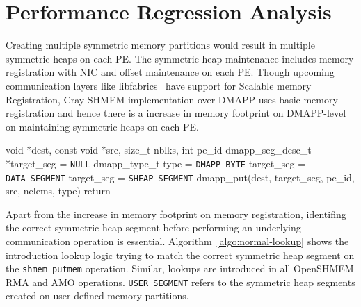 \section{Performance Regression Analysis}
\label{src:regression}
Creating multiple symmetric memory partitions would result in
multiple symmetric heaps on each PE. The symmetric heap maintenance
includes memory registration with NIC and offset maintenance on
each PE. Though upcoming communication layers like
libfabrics~\cite{libfabrics} have support for Scalable memory
Registration, Cray SHMEM implementation over DMAPP uses basic memory
registration and hence there is a increase in memory footprint on
DMAPP-level on maintaining symmetric heaps on each PE.

\vspace{-20pt}
\begin{algorithm}[!h]
\begin{algorithmic}
    {void *dest, const void *src, size\_t nblks, int pe\_id}\;
        dmapp\_seg\_desc\_t *target\_seg = \texttt{NULL}\;
        dmapp\_type\_t type = \texttt{DMAPP\_BYTE}\;
         {
            target\_seg = \texttt{DATA\_SEGMENT}\;
        }  {
            target\_seg = \texttt{SHEAP\_SEGMENT}\;
        } 
        dmapp\_put(dest, target\_seg, pe\_id, src, nelems, type)\;
        return\;
    \EndProcedure
    \caption{Lookup logic with N symmetric memory partitions per PE}
    \label{algo:normal-lookup}
\end{algorithmic}
\end{algorithm}
\vspace{-20pt}

Apart from the increase in memory footprint on memory registration,
identifing the correct symmetric heap segment before performing an
underlying communication operation is essential. %
Algorithm~\ref{algo:normal-lookup} shows the introduction lookup
logic trying to match the correct symmetric heap segment on the
\texttt{shmem\_putmem} operation. Similar, lookups are introduced in
all OpenSHMEM RMA and AMO operations. \texttt{USER\_SEGMENT} refers to
the symmetric heap segments created on user-defined memory partitions.

